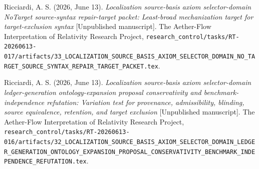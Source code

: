 \documentclass[11pt]{article}
\begin{document}
Ricciardi, A. S. (2026, June 13). \emph{Localization source-basis axiom
selector-domain NoTarget source-syntax repair-target packet: Least-broad
mechanization target for target-exclusion syntax} [Unpublished manuscript].
The Aether-Flow Interpretation of Relativity Research Project,
\texttt{research\_control/tasks/RT-20260613-017/artifacts/33\_LOCALIZATION\_SOURCE\_BASIS\_AXIOM\_SELECTOR\_DOMAIN\_NO\_TARGET\_SOURCE\_SYNTAX\_REPAIR\_TARGET\_PACKET.tex}.

Ricciardi, A. S. (2026, June 13). \emph{Localization source-basis axiom
selector-domain ledger-generation ontology-expansion proposal
conservativity and benchmark-independence refutation: Variation test for
provenance, admissibility, blinding, source equivalence, retention, and
target exclusion} [Unpublished manuscript]. The Aether-Flow Interpretation
of Relativity Research Project,
\texttt{research\_control/tasks/RT-20260613-016/artifacts/32\_LOCALIZATION\_SOURCE\_BASIS\_AXIOM\_SELECTOR\_DOMAIN\_LEDGER\_GENERATION\_ONTOLOGY\_EXPANSION\_PROPOSAL\_CONSERVATIVITY\_BENCHMARK\_INDEPENDENCE\_REFUTATION.tex}.
\end{document}
